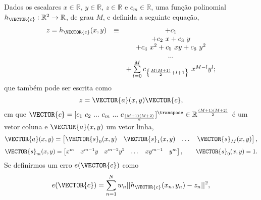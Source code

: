 \begin{myproofT}\label{proof:theo:maphxr2r1}
Dados
os escalares $x \in \mathbb{R}$, $y \in \mathbb{R}$, $z \in \mathbb{R}$ e $c_m \in \mathbb{R}$,
uma função polinomial $h_{\VECTOR{c}}:\mathbb{R}^2 \rightarrow \mathbb{R}$, de grau $M$, e 
definida a seguinte equação,
\begin{equation}\label{eq:proof:theo:maphxr2r1:1}
\begin{matrix}
z=h_{\VECTOR{c}}(x,y) & \equiv & +c_{1}\\
              ~ & ~ & +c_{2}~x + c_{3}~y\\
              ~ & ~ & +c_{4}~x^2 +c_{5}~xy + c_{6}~y^2\\
              ~ & ~ &  ...\\
              ~ & ~ & +\sum \limits_{l=0}^{M}c_{\left\{ \frac{M(M+1)}{2}+l+1\right\}}~x^{M-l}y^{l};
\end{matrix} 
\end{equation}
que também pode ser escrita como
\begin{equation}
z=\VECTOR{a}(x,y)\VECTOR{c},
\end{equation}
em que $\VECTOR{c}=[c_1~ c_2~ ...~ c_m~ ...~ c_{\frac{(M+1)(M+2)}{2}}]^{\transpose} \in \mathbb{R}^{\frac{(M+1)(M+2)}{2}}$ é um vetor coluna e
$\VECTOR{a}(x,y)$ um vetor linha,
\begin{equation}
\VECTOR{a}(x,y)= 
\begin{bmatrix}
\VECTOR{s}_{0}(x,y) & \VECTOR{s}_{1}(x,y) &  \dots  & \VECTOR{s}_{M}(x,y)
\end{bmatrix},
\end{equation}
\begin{equation}
\VECTOR{s}_{m}(x,y)=
\begin{bmatrix}
x^m  & x^{m-1} y  & x^{m-2} y^2    & \dots  & x y^{m-1} &  y^m 
\end{bmatrix},
\qquad
\VECTOR{s}_{0}(x,y)=1.
\end{equation}
Se definirmos um erro $e(\VECTOR{c})$ como
\begin{equation}\label{eq:proof:theo:maphxr2r1:2}
e(\VECTOR{c}) 
=  
\sum_{n=1}^{N} w_n||h_{\VECTOR{c}}(x_n,y_n)-z_n||^2, 

\end{equation}
\end{myproofT}
